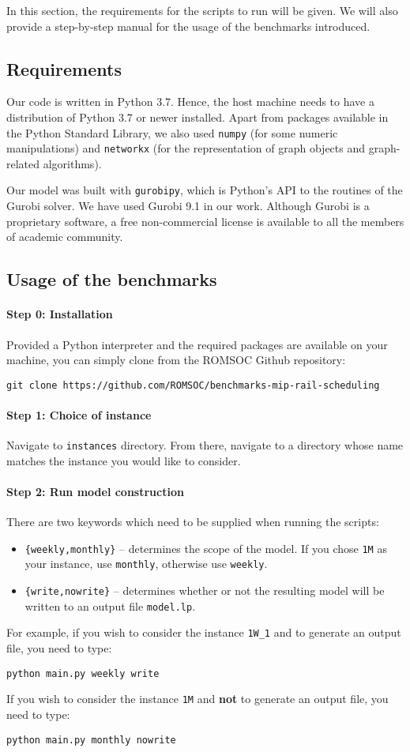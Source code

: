 In this section, the requirements for the scripts to run will be given. We will also provide a step-by-step manual for the usage of the benchmarks introduced.

\subsection{Requirements}
Our code is written in Python 3.7. Hence, the host machine needs to have a distribution of Python 3.7 or newer installed. Apart from packages available in the Python Standard Library, we also used \texttt{numpy} (for some numeric manipulations) and \texttt{networkx} (for the representation of graph objects and graph-related algorithms).

Our model was built with \texttt{gurobipy}, which is Python's API to the routines of the Gurobi solver. We have used Gurobi 9.1 in our work. Although Gurobi is a proprietary software, a free non-commercial license is available to all the members of academic community. 

\subsection{Usage of the benchmarks}
\paragraph{Step 0: Installation} Provided a Python interpreter and the required packages are available on your machine, you can simply clone from the ROMSOC Github repository: 

\noindent
\texttt{git clone https://github.com/ROMSOC/benchmarks-mip-rail-scheduling}

\paragraph{Step 1: Choice of instance} Navigate to \texttt{instances} directory. From there, navigate to a directory whose name matches the instance you would like to consider.

\paragraph{Step 2: Run model construction} There are two keywords which need to be supplied when running the scripts:
\begin{itemize}
    \item \texttt{\{weekly,monthly\}} -- determines the scope of the model. 
    If you chose \texttt{1M} as your instance, use \texttt{monthly},  otherwise use \texttt{weekly}.
    \item \texttt{\{write,nowrite\}} -- determines whether or not the resulting model will be written to an output file \texttt{model.lp}. 
\end{itemize}
For example, if you wish to consider the instance \texttt{1W\_1} and to generate an output file, you need to type:

\noindent
\texttt{python main.py weekly write}

\noindent
If you wish to consider the instance \texttt{1M} and \textbf{not} to generate an output file, you need to type:

\noindent
\texttt{python main.py monthly nowrite}



